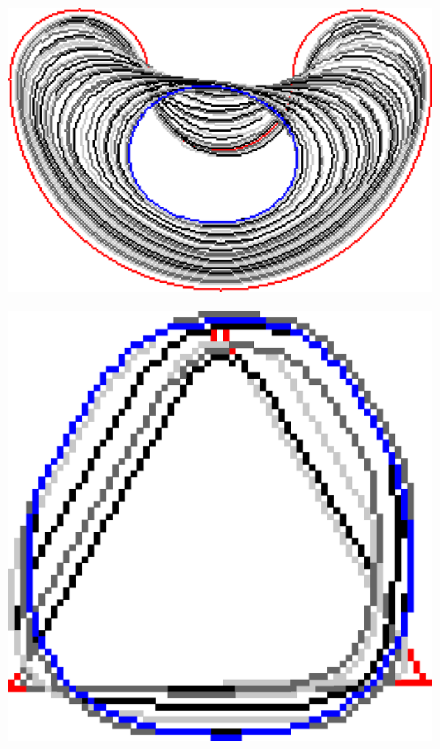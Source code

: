 \begin{figure}[!h]
\begin{minipage}[b]{0.5\textwidth}
	\includegraphics[scale=0.25]{figures/chapter5/exhaustive-selection/ii-r5-lp0.01/bean/summary.pdf}			
\end{minipage}%
\begin{minipage}[b]{0.5\textwidth}
\center
	\includegraphics[scale=0.185]{figures/chapter5/exhaustive-selection/mdca-lp0.01/triangle/summary.pdf}\\[2em]
	

\end{minipage}
\end{figure}
